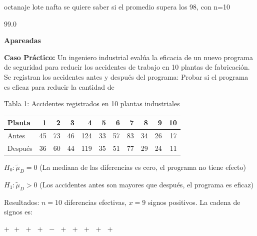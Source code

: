 \documentclass[12pt,a4paper]{article}
\begin{document}
octanaje lote nafta se quiere saber si el promedio supera los 98, con n=10

\begin{center}
99.0        
\end{center}

{\fontsize{16}{19}\selectfont\bfseries Apareadas\par}

\textbf{Caso Práctico:} Un ingeniero industrial evalúa la eficacia de un nuevo programa de seguridad para reducir los accidentes de trabajo en 10 plantas de fabricación. Se registran los accidentes antes y después del programa: Probar si el programa es eficaz para reducir la cantidad de

\begin{center}
Tabla 1: Accidentes registrados en 10 plantas industriales

\vspace{2pt}
\begin{tabular}{l r r r r r r r r r r}
\toprule
\textbf{Planta} & \textbf{1} & \textbf{2} & \textbf{3} & \textbf{4} & \textbf{5} & \textbf{6} & \textbf{7} & \textbf{8} & \textbf{9} & \textbf{10} \\
\midrule
Antes & 45 & 73 & 46 & 124 & 33 & 57 & 83 & 34 & 26 & 17 \\
Después & 36 & 60 & 44 & 119 & 35 & 51 & 77 & 29 & 24 & 11 \\
\bottomrule
\end{tabular}
\end{center}

$H_0 : \tilde{\mu}_D = 0$ \quad (La mediana de las diferencias es cero, el programa no tiene efecto)

$H_1 : \tilde{\mu}_D > 0$ \quad (Los accidentes antes son mayores que después, el programa es eficaz)

Resultados: $n = 10$ diferencias efectivas, $x = 9$ signos positivos. La cadena de signos es:

\begin{center}
$+\ \ +\ \ +\ \ +\ \ -\ \ +\ \ +\ \ +\ \ +\ \ +$
\end{center}
\end{document}

